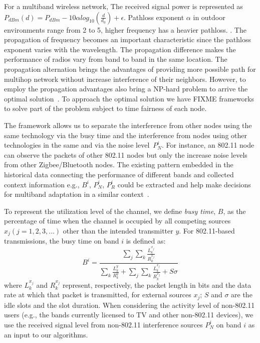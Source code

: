 For a multiband wireless network, 
The received signal power is represented as $P_{dBm}(d)=P_{dBm}-10\alpha log_{10}(\frac{d}{d_0})+\epsilon$. Pathloss exponent $\alpha$ in outdoor environments range from 2 to 5, higher frequency has a heavier pathloss. \cite{camp2006measurement}. 
The propagation of frequency becomes an important characteristic since the pathloss exponent varies with the wavelength. The propagation difference makes the performance of radios vary from band to band in the same location. The propagation alternation brings the advantages of providing more possible path for multihop network without increase interference of their neighbors. 
However, to employ the propagation advantages also bring a NP-hard problem to arrive the optimal solution~\cite{arkoulis2013optimal}. To approach the optimal solution we have FIXME frameworks to solve part of the problem subject to time fairness of each node.

The framework allows us to 
separate the interference from other nodes using the same technology via the busy time and the interference from nodes using other technologies in the same and via the noise level~$P_N^i$. 
For instance, an 802.11 node can observe the packets of other 802.11 nodes but only the increase noise levels from other Zigbee/Bluetooth nodes.
The existing pattern embedded in the historical data connecting 
the performance of different bands and collected context information 
e.g.,  $B^i$, $P_N^i$, $P_R^i$ 
could be extracted and help make decisions
for multiband adaptation in a similar context~\cite{meikle2012global}.

To represent the utilization level of the channel, we define \emph{busy time}, $B$,
as the percentage of time when the channel is occupied by 
all competing sources $x_j ( j = 1, 2, 3, ...)$ other than the intended transmitter $y$. 
For 802.11-based transmissions, the busy time on band $i$ is defined as:
\begin{equation}
\label{eqn:80211activity}
B^i = \frac{\sum_j{\sum_k{\frac{L_k^{x_j}}{R_k^{x_j}}}}}{\sum_k{\frac{L_k^y}{R_k^y}}+\sum_j{\sum_k{\frac{L_k^{x_j}}{R_k^{x_j}}}}+S\sigma}
\end{equation}
where $L_k^{x_j}$ and $R_k^{x_j}$ represent, respectively, the packet length in bits and the data
rate at which that packet is transmitted, for external sources $x_j$;
$S$ and $\sigma$ are the idle slots and the slot duration. 
When considering the activity level of non-802.11 users 
(e.g., the bands currently licensed to TV and other non-802.11 devices), 
we use the received signal level from non-802.11 interference sources $P_N^i$ 
on band $i$ as an input to our algorithms. 

